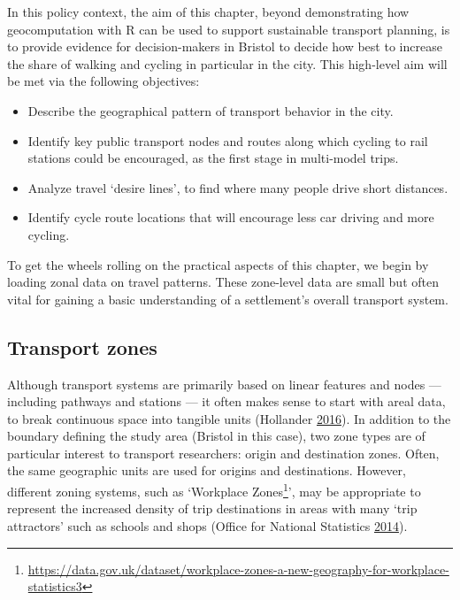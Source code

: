 \documentclass[]{krantz}
\providecommand{\tightlist}{%
  \setlength{\itemsep}{0pt}\setlength{\parskip}{0pt}}
\let\rmarkdownfootnote\footnote%
\def\footnote{\protect\rmarkdownfootnote}
\renewcommand{\href}[2]{#2\footnote{\url{#1}}}
\begin{document}
In this policy context, the aim of this chapter, beyond demonstrating how geocomputation with R can be used to support sustainable transport planning, is to provide evidence for decision-makers in Bristol to decide how best to increase the share of walking and cycling in particular in the city.
This high-level aim will be met via the following objectives:

\begin{itemize}
\tightlist
\item
  Describe the geographical pattern of transport behavior in the city.
\item
  Identify key public transport nodes and routes along which cycling to rail stations could be encouraged, as the first stage in multi-model trips.
\item
  Analyze travel `desire lines', to find where many people drive short distances.
\item
  Identify cycle route locations that will encourage less car driving and more cycling.
\end{itemize}

To get the wheels rolling on the practical aspects of this chapter, we begin by loading zonal data on travel patterns.
These zone-level data are small but often vital for gaining a basic understanding of a settlement's overall transport system.

\hypertarget{transport-zones}{%
\subsection{Transport zones}\label{transport-zones}}

Although transport systems are primarily based on linear features and nodes --- including pathways and stations --- it often makes sense to start with areal data, to break continuous space into tangible units (Hollander \protect\hyperlink{ref-hollander_transport_2016}{2016}).
In addition to the boundary defining the study area (Bristol in this case), two zone types are of particular interest to transport researchers: origin and destination zones.
Often, the same geographic units are used for origins and destinations.
However, different zoning systems, such as `\href{https://data.gov.uk/dataset/workplace-zones-a-new-geography-for-workplace-statistics3}{Workplace Zones}', may be appropriate to represent the increased density of trip destinations in areas with many `trip attractors' such as schools and shops (Office for National Statistics \protect\hyperlink{ref-office_for_national_statistics_workplace_2014}{2014}).
\end{document}
